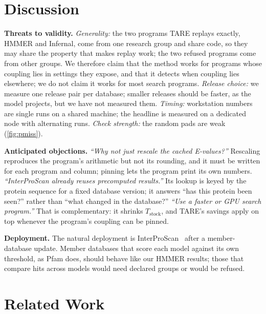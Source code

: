 \documentclass[letterpaper,twocolumn,10pt]{article}
\theoremstyle{definition}
\newcommand{\sys}{TARE\xspace}
\begin{document}
\section{Discussion}
\label{sec:discussion}

\textbf{Threats to validity.} \textit{Generality:} the two programs \sys replays exactly, HMMER and Infernal, come from one
research group and share code, so they may share the property that makes replay work; the two refused programs come from
other groups. We therefore claim that the method works for programs whose coupling lies in settings they expose, and that
it detects when coupling lies elsewhere; we do not claim it works for most search programs. \textit{Release choice:} we
measure one release pair per database; smaller releases should be faster, as the model projects, but we have not measured
them. \textit{Timing:} workstation numbers are single runs on a shared machine; the headline is measured on a dedicated
node with alternating runs. \textit{Check strength:} the random pads are weak (\cref{fig:pmiss}).

\textbf{Anticipated objections.} \textit{``Why not just rescale the cached E-values?''} Rescaling reproduces the program's
arithmetic but not its rounding, and it must be written for each program and column; pinning lets the program print its
own numbers. \textit{``InterProScan already reuses precomputed results.''} Its lookup is keyed by the protein sequence for
a fixed database version; it answers ``has this protein been seen?'' rather than ``what changed in the database?''
\textit{``Use a faster or GPU search program.''} That is complementary: it shrinks $T_{\text{stock}}$, and \sys's savings
apply on top whenever the program's coupling can be pinned.

\textbf{Deployment.} The natural deployment is InterProScan~\cite{jones2014interproscan} after a member-database update.
Member databases that score each model against its own threshold, as Pfam does, should behave like our HMMER results;
those that compare hits across models would need declared groups or would be refused.

\section{Related Work}
\label{sec:related}
\end{document}
